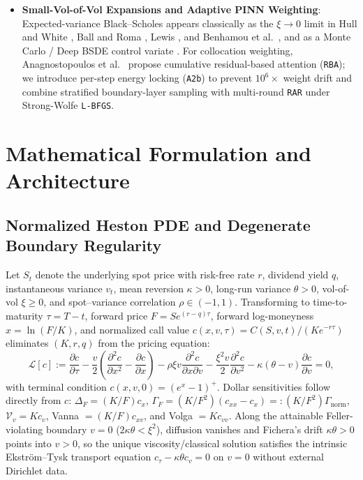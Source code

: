 \documentclass[preprint,12pt]{elsarticle}
\begin{document}
\begin{itemize}
  \item \textbf{Small-Vol-of-Vol Expansions and Adaptive PINN Weighting}: Expected-variance Black--Scholes appears classically as the $\xi \to 0$ limit in Hull and White \cite{hull1987pricing}, Ball and Roma \cite{ball1994stochastic}, Lewis \cite{lewis2000option}, and Benhamou et al.\ \cite{benhamou2010time}, and as a Monte Carlo / Deep BSDE control variate \cite{takahashi2022control}. For collocation weighting, Anagnostopoulos et al.\ \cite{anagnostopoulos2024residual} propose cumulative residual-based attention (\texttt{RBA}); we introduce per-step energy locking (\texttt{A2b}) to prevent $10^6\times$ weight drift and combine stratified boundary-layer sampling with multi-round \texttt{RAR} \cite{lu2021deepxde} under Strong-Wolfe \texttt{L-BFGS}.
\end{itemize}

\section{Mathematical Formulation and Architecture}
\label{sec:method}

\subsection{Normalized Heston PDE and Degenerate Boundary Regularity}

Let $S_t$ denote the underlying spot price with risk-free rate $r$, dividend yield $q$, instantaneous variance $v_t$, mean reversion $\kappa > 0$, long-run variance $\theta > 0$, vol-of-vol $\xi \ge 0$, and spot--variance correlation $\rho \in (-1, 1)$. Transforming to time-to-maturity $\tau = T - t$, forward price $F = S e^{(r-q)\tau}$, forward log-moneyness $x = \ln(F/K)$, and normalized call value $c(x, v, \tau) = C(S, v, t)/(K e^{-r\tau})$ eliminates $(K, r, q)$ from the pricing equation:
\begin{equation}
  \mathcal{L}[c] := \frac{\partial c}{\partial \tau} - \frac{v}{2}\left(\frac{\partial^2 c}{\partial x^2} - \frac{\partial c}{\partial x}\right) - \rho\xi v \frac{\partial^2 c}{\partial x \partial v} - \frac{\xi^2 v}{2}\frac{\partial^2 c}{\partial v^2} - \kappa(\theta - v)\frac{\partial c}{\partial v} = 0,
  \label{eq:heston_pde}
\end{equation}
with terminal condition $c(x, v, 0) = (e^x - 1)^+$. Dollar sensitivities follow directly from $c$: $\Delta_F = (K/F) c_x$, $\Gamma_F = (K/F^2)(c_{xx} - c_x) =: (K/F^2)\Gamma_{\mathrm{norm}}$, $\mathcal{V}_v = K c_v$, Vanna $= (K/F) c_{xv}$, and Volga $= K c_{vv}$. Along the attainable Feller-violating boundary $v = 0$ ($2\kappa\theta < \xi^2$), diffusion vanishes and Fichera's drift $\kappa\theta > 0$ points into $v > 0$, so the unique viscosity/classical solution satisfies the intrinsic Ekstr\"om--Tysk \cite{ekstrom2010black} transport equation $c_\tau - \kappa\theta c_v = 0$ on $v = 0$ without external Dirichlet data.
\end{document}
